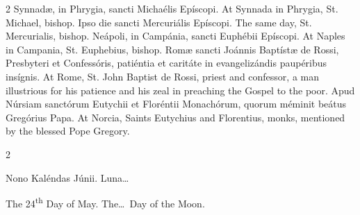 \begin{paracol}{2}
\switchcolumn*
{}
Synnadæ, in Phrygia, 
 sancti Michaélis Epíscopi.
\switchcolumn
{}
At Synnada in Phrygia, St. Michael, 
 bishop.
\switchcolumn*
{}
Ipso die sancti 
 Mercuriális Epíscopi.
\switchcolumn
{}
The same day, St. Mercurialis, 
 bishop.
\switchcolumn*
{}
Neápoli, in Campánia, 
 sancti Euphébii Epíscopi.
\switchcolumn
{}
At Naples in Campania, St. 
 Euphebius, bishop.
\switchcolumn*
{}
Romæ sancti Joánnis 
 Baptístæ de Rossi, Presbyteri et Confessóris, patiéntia et caritáte in 
 evangelizándis paupéribus insígnis.
\switchcolumn
{}
At Rome, St. John Baptist de Rossi, 
 priest and confessor, a man illustrious for his patience and his zeal in 
 preaching the Gospel to the poor.
\switchcolumn*
{}
Apud Núrsiam sanctórum 
 Eutychii et Floréntii Monachórum, quorum méminit beátus Gregórius Papa.
\switchcolumn
{}
At Norcia, Saints Eutychius and 
 Florentius, monks, mentioned by the blessed Pope Gregory.
\switchcolumn*
{}
\end{paracol}


\begin{paracol}{2}
\begin{center}{\color{gregoriocolor} Nono Kaléndas Júnii. 
 Luna\dots\ }\end{center}
\switchcolumn
{}
\begin{center}{\color{gregoriocolor} The 
 24\textsuperscript{th} Day of May. The\dots\ Day of the Moon.}\end{center}
\end{paracol}

